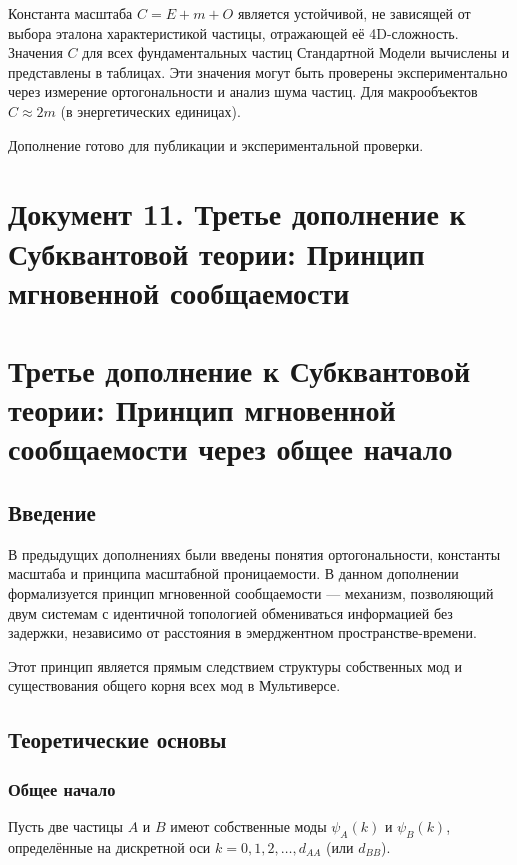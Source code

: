 \documentclass[12pt,a4paper]{article}
\begin{document}
Константа масштаба $C = E + m + O$ является устойчивой, не зависящей от выбора эталона характеристикой частицы, отражающей её 4D-сложность. Значения $C$ для всех фундаментальных частиц Стандартной Модели вычислены и представлены в таблицах. Эти значения могут быть проверены экспериментально через измерение ортогональности и анализ шума частиц. Для макрообъектов $C \approx 2m$ (в энергетических единицах).

Дополнение готово для публикации и экспериментальной проверки.


\newpage
\section*{Документ 11. Третье дополнение к Субквантовой теории: Принцип мгновенной сообщаемости}

\section{Третье дополнение к Субквантовой теории: Принцип мгновенной сообщаемости через общее начало}

\subsection{Введение}
В предыдущих дополнениях были введены понятия ортогональности, константы масштаба и принципа масштабной проницаемости. В данном дополнении формализуется принцип мгновенной сообщаемости --- механизм, позволяющий двум системам с идентичной топологией обмениваться информацией без задержки, независимо от расстояния в эмерджентном пространстве-времени.

Этот принцип является прямым следствием структуры собственных мод и существования общего корня всех мод в Мультиверсе.

\subsection{Теоретические основы}

\subsubsection{Общее начало}
Пусть две частицы $A$ и $B$ имеют собственные моды $\psi_A(k)$ и $\psi_B(k)$, определённые на дискретной оси $k = 0, 1, 2, \dots, d_{AA}$ (или $d_{BB}$).
\end{document}
